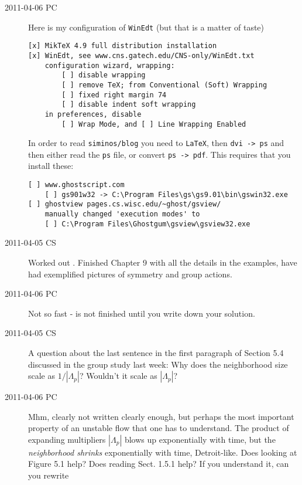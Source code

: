 \begin{description}
\item[2011-04-06 PC] Here is my configuration of \texttt{WinEdt}
(but that is a matter of taste)

\begin{verbatim}
[x] MikTeX 4.9 full distribution installation
[x] WinEdt, see www.cns.gatech.edu/CNS-only/WinEdt.txt
	configuration wizard, wrapping:
        [ ] disable wrapping
		[ ] remove TeX; from Conventional (Soft) Wrapping
		[ ] fixed right margin 74
		[ ] disable indent soft wrapping
	in preferences, disable
		[ ] Wrap Mode, and [ ] Line Wrapping Enabled
\end{verbatim}

In order to read \texttt{siminos/blog} you need to \texttt{LaTeX},
then \texttt{dvi -> ps} and then either read the \texttt{ps} file, or
convert \texttt{ps -> pdf}. This requires that you install these:

\begin{verbatim}
[ ] www.ghostscript.com
    [ ] gs901w32 -> C:\Program Files\gs\gs9.01\bin\gswin32.exe
[ ] ghostview pages.cs.wisc.edu/~ghost/gsview/
    manually changed 'execution modes' to
    [ ] C:\Program Files\Ghostgum\gsview\gsview32.exe
\end{verbatim}


\item[2011-04-05 CS] Worked out . Finished Chapter 9
with all the details in the examples, have had exemplified pictures of
symmetry and group actions.

\item[2011-04-06 PC] Not so fast -  is not finished
until you write down your solution.

\item[2011-04-05 CS]
    A question about the last sentence in the first paragraph of Section
    5.4  discussed in the group study last week: Why does the
    neighborhood size scale as $1/|\Lambda_{p}|$? Wouldn't it scale as
    $|\Lambda_{p}|$?

\item[2011-04-06 PC] Mhm, clearly not written clearly enough, but
perhaps the most important property of an unstable flow
that one has to understand. The product of expanding multipliers
$|\Lambda_{p}|$ blows up exponentially with time, but the
\emph{neighborhood shrinks} exponentially with time, Detroit-like.
 Does looking
at Figure 5.1 help? Does reading Sect. 1.5.1 help? If you understand it,
can you rewrite


\end{description}
